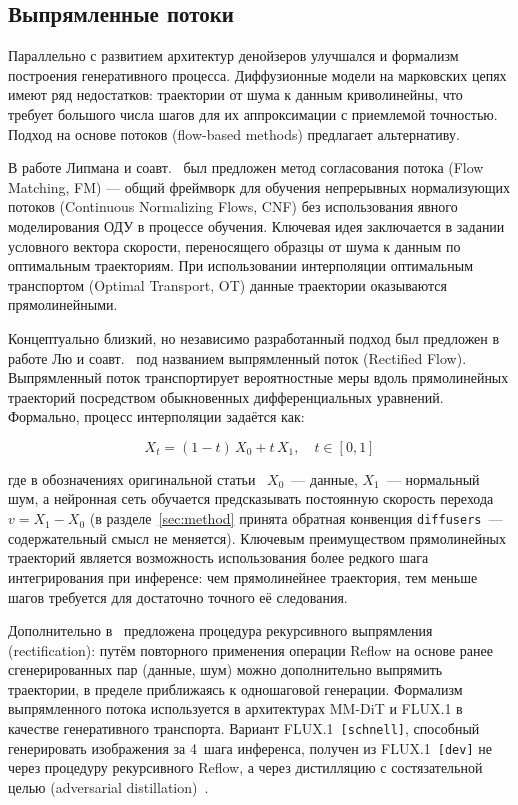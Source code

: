 \subsection{Выпрямленные потоки}

Параллельно с развитием архитектур денойзеров улучшался и формализм построения генеративного процесса. Диффузионные модели на марковских цепях имеют ряд недостатков: траектории от шума к данным криволинейны, что требует большого числа шагов для их аппроксимации с приемлемой точностью. Подход на основе потоков (flow-based methods) предлагает альтернативу.

В работе Липмана и соавт.~\cite{lipman2023flow} был предложен метод согласования потока (Flow Matching, FM) --- общий фреймворк для обучения непрерывных нормализующих потоков (Continuous Normalizing Flows, CNF) без использования явного моделирования ОДУ в процессе обучения. Ключевая идея заключается в задании условного вектора скорости, переносящего образцы от шума к данным по оптимальным траекториям. При использовании интерполяции оптимальным транспортом (Optimal Transport, OT) данные траектории оказываются прямолинейными.

Концептуально близкий, но независимо разработанный подход был предложен в работе Лю и соавт.~\cite{liu2022rectifiedflow} под названием выпрямленный поток (Rectified Flow). Выпрямленный поток транспортирует вероятностные меры вдоль прямолинейных траекторий посредством обыкновенных дифференциальных уравнений. Формально, процесс интерполяции задаётся как:

\begin{equation}
    X_t = (1 - t)\, X_0 + t\, X_1, \quad t \in [0, 1]
    \label{eq:rectflow_interp}
\end{equation}

где в обозначениях оригинальной статьи~\cite{liu2022rectifiedflow} $X_0$~--- данные, $X_1$~--- нормальный шум, а нейронная сеть обучается предсказывать постоянную скорость перехода $v = X_1 - X_0$ (в разделе~\ref{sec:method} принята обратная конвенция \texttt{diffusers}~--- содержательный смысл не меняется). Ключевым преимуществом прямолинейных траекторий является возможность использования более редкого шага интегрирования при инференсе: чем прямолинейнее траектория, тем меньше шагов требуется для достаточно точного её следования.

Дополнительно в~\cite{liu2022rectifiedflow} предложена процедура рекурсивного выпрямления (rectification): путём повторного применения операции Reflow на основе ранее сгенерированных пар (данные, шум) можно дополнительно выпрямить траектории, в пределе приближаясь к одношаговой генерации. Формализм выпрямленного потока используется в архитектурах MM-DiT и FLUX.1 в качестве генеративного транспорта. Вариант FLUX.1~\texttt{[schnell]}, способный генерировать изображения за 4~шага инференса, получен из FLUX.1~\texttt{[dev]} не через процедуру рекурсивного Reflow, а через дистилляцию с состязательной целью (adversarial distillation)~\cite{blackforest2024flux}.


